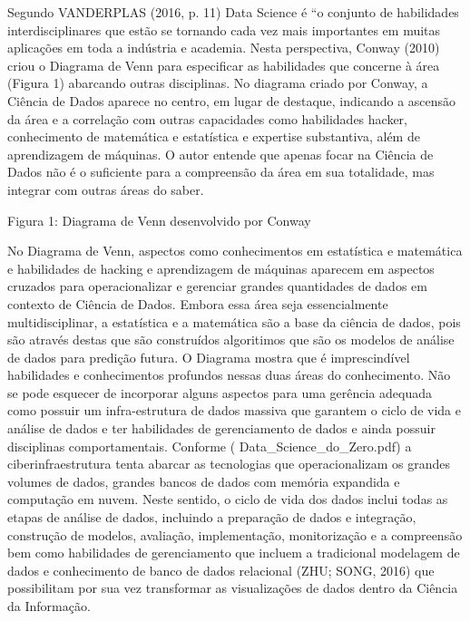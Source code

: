 Segundo VANDERPLAS (2016, p. 11) Data Science é “o conjunto de habilidades interdisciplinares que estão se tornando cada vez mais importantes em muitas aplicações em toda a indústria e academia. Nesta perspectiva, Conway (2010) criou o Diagrama de Venn para especificar as habilidades que concerne à área (Figura 1) abarcando outras disciplinas. No diagrama criado por Conway, a Ciência de Dados aparece no centro, em lugar de destaque, indicando a ascensão da área e a correlação com outras capacidades como habilidades hacker, conhecimento de matemática e estatística e expertise substantiva, além de aprendizagem de máquinas. O autor entende que apenas focar na Ciência de Dados não é o suficiente para a compreensão da área em sua totalidade, mas integrar com outras áreas do saber.  

 Figura 1: Diagrama de Venn desenvolvido por Conway  

   No Diagrama de Venn, aspectos como conhecimentos em estatística e matemática e habilidades de hacking e aprendizagem de máquinas aparecem em aspectos cruzados para operacionalizar e gerenciar grandes quantidades de dados em contexto de Ciência de Dados. Embora essa área seja essencialmente multidisciplinar, a estatística e a matemática são a base da ciência de dados, pois são através destas que são construídos algoritimos que são os modelos de análise de dados para predição futura. O Diagrama mostra que é imprescindível habilidades e conhecimentos profundos nessas duas áreas do conhecimento. Não se pode esquecer de incorporar alguns aspectos para uma gerência adequada como possuir um infra-estrutura de dados massiva que garantem o ciclo de vida e análise de dados e ter habilidades de gerenciamento de dados e ainda possuir disciplinas comportamentais. Conforme ( Data_Science_do_Zero.pdf)  a ciberinfraestrutura tenta abarcar as tecnologias que operacionalizam os grandes volumes de dados, grandes bancos de dados com memória expandida e computação em nuvem. Neste sentido, o ciclo de vida dos dados inclui todas as etapas de análise de dados, incluindo a preparação de dados e integração, construção de modelos, avaliação, implementação,  monitorização e a compreensão bem como habilidades de gerenciamento que incluem a tradicional modelagem de dados e conhecimento de banco de dados relacional (ZHU; SONG, 2016) que possibilitam por sua vez transformar as visualizações de dados dentro da Ciência da Informação.
 

